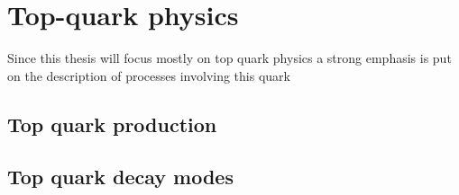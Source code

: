 
\chapter{Top-quark physics} \label{sec:top_quark_physics}
Since this thesis will focus mostly on top quark physics a strong emphasis is
put on the description of processes involving this quark
\section{Top quark production} \label{sec:top_quark_production}
\section{Top quark decay modes} \label{sec:top_quark_decay_modes}
